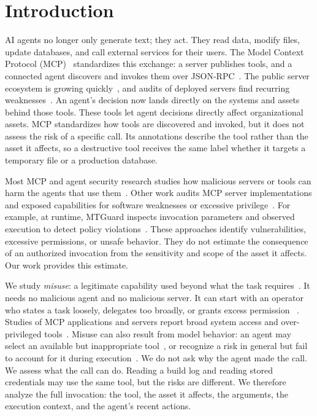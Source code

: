 \documentclass[sigconf]{acmart}
\begin{document}
\section{Introduction}
\label{sec:intro}

AI agents no longer only generate text; they act. They read data, modify files,
update databases, and call external services for their users. The Model Context
Protocol (MCP)~\cite{anthropic2024mcp} standardizes this exchange: a server
publishes tools, and a connected agent discovers and invokes them over
JSON-RPC~\cite{mcp2026spec}. The public server ecosystem is growing quickly~\cite{hou2026mcp}, and audits of deployed servers find recurring weaknesses~\cite{hasan2025firstglance}. An agent's decision
now lands directly on the systems and assets behind those tools. These tools let agent decisions directly affect organizational assets. MCP
standardizes how tools are discovered and invoked, but it does not assess the
risk of a specific call. Its annotations describe the tool rather than the
asset it affects, so a destructive tool receives the same label whether it
targets a temporary file or a production database.

Most MCP and agent security research studies how malicious servers or tools can
harm the agents that use
them~\cite{invariant2025toolpoisoning,shi2025toolhijacker}. Other work audits
MCP server implementations and exposed capabilities for software weaknesses or
excessive privilege~\cite{kumar2026mcpinsos,huang2026auditing}. For example, at runtime,
MTGuard inspects invocation parameters and observed execution to detect policy
violations~\cite{he2026mtguard}. These approaches identify vulnerabilities,
excessive permissions, or unsafe behavior. They do not estimate the consequence
of an authorized invocation from the sensitivity and scope of the asset it
affects. Our work provides this estimate.


We study \emph{misuse}: a legitimate capability used beyond what the task requires~\cite{anderson1980threat}. It needs no malicious agent and no malicious server. It can start with an operator who states a task loosely, delegates too broadly, or grants excess permission~ \cite{owasp2025llm06} . Studies of MCP
applications and servers report broad system access and over-privileged
tools~\cite{li2025privilege,huang2026auditing}. Misuse can also result from
model behavior: an agent may select an available but inappropriate
tool~\cite{yin2025reasoningtrap}, or recognize a risk in general but fail to
account for it during execution~\cite{tang2025riskknowledge}. We do not ask why the agent made the call. We assess what the call can do.
Reading a build log and reading stored credentials may use the same tool, but
the risks are different. We therefore analyze the full invocation: the tool,
the asset it affects, the arguments, the execution context, and the agent's
recent actions.
\end{document}
